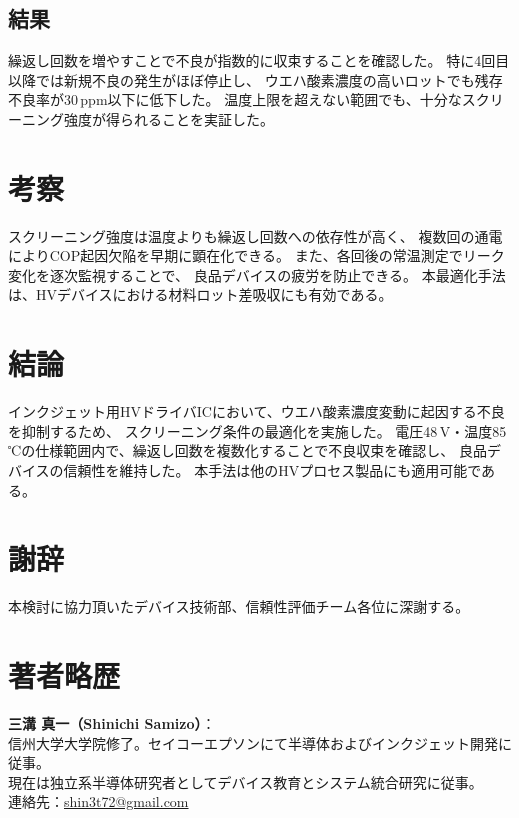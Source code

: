 \documentclass[twocolumn]{ieeetran}
\begin{document}
\subsection{結果}
繰返し回数を増やすことで不良が指数的に収束することを確認した。
特に4回目以降では新規不良の発生がほぼ停止し、
ウエハ酸素濃度の高いロットでも残存不良率が30\,ppm以下に低下した。
温度上限を超えない範囲でも、十分なスクリーニング強度が得られることを実証した。

\section{考察}
スクリーニング強度は温度よりも繰返し回数への依存性が高く、
複数回の通電によりCOP起因欠陥を早期に顕在化できる。
また、各回後の常温測定でリーク変化を逐次監視することで、
良品デバイスの疲労を防止できる。
本最適化手法は、HVデバイスにおける材料ロット差吸収にも有効である。

\section{結論}
インクジェット用HVドライバICにおいて、ウエハ酸素濃度変動に起因する不良を抑制するため、
スクリーニング条件の最適化を実施した。
電圧48\,V・温度85\,℃の仕様範囲内で、繰返し回数を複数化することで不良収束を確認し、
良品デバイスの信頼性を維持した。
本手法は他のHVプロセス製品にも適用可能である。

\section*{謝辞}
本検討に協力頂いたデバイス技術部、信頼性評価チーム各位に深謝する。

\section*{著者略歴}
\noindent\textbf{三溝 真一（Shinichi Samizo）}：\\
信州大学大学院修了。セイコーエプソンにて半導体およびインクジェット開発に従事。\\
現在は独立系半導体研究者としてデバイス教育とシステム統合研究に従事。\\
連絡先：\href{mailto:shin3t72@gmail.com}{shin3t72@gmail.com}
\end{document}
